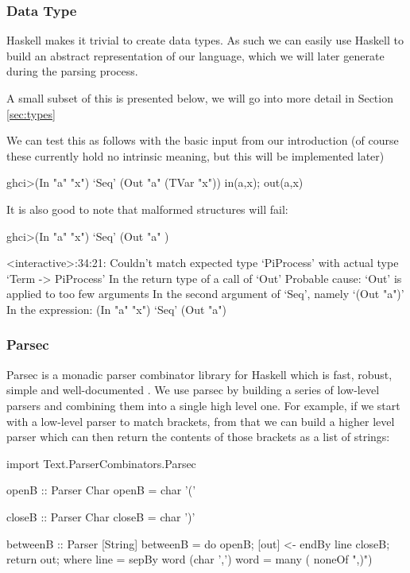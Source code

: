 \subsubsection{Data Type}
Haskell makes it trivial to create data types. As such we can easily use Haskell to build an abstract representation of our language, which we will later generate during the parsing process.

A small subset of this is presented below, we will go into more detail in Section \ref{sec:types}
    


We can test this as follows with the basic input from our introduction (of course these currently hold no intrinsic meaning, but this will be implemented later)

\begin{code}
    ghci>(In "a" "x") `Seq' (Out "a" (TVar "x"))
    in(a,x);
    out(a,x)
\end{code}

It is also good to note that malformed structures will fail:

\begin{code}
    ghci>(In "a" "x") `Seq' (Out "a" )

    <interactive>:34:21:
        Couldn't match expected type `PiProcess'
        with actual type `Term -> PiProcess'
        In the return type of a call of `Out'
        Probable cause: `Out' is applied to too few arguments
        In the second argument of `Seq', namely `(Out "a")'
        In the expression: (In "a" "x") `Seq' (Out "a")
\end{code}

\subsubsection{Parsec}

Parsec is a monadic parser combinator library for Haskell which is fast, robust, simple and well-documented \cite{lm01}. We use parsec by building a series of low-level parsers and combining them into a single high level one.
For example, if we start with a low-level parser to match brackets, from that we can build a higher level parser which can then return the contents of those brackets as a list of strings:

\begin{code}
import Text.ParserCombinators.Parsec

openB :: Parser Char
openB = char '(' 

closeB :: Parser Char
closeB = char ')' 

betweenB :: Parser [String]
betweenB = do{
            openB;
            [out] <- endBy line closeB;
            return out;
        } 
    where
        line = sepBy word (char ',')
        word = many ( noneOf ",)")
\end{code}

